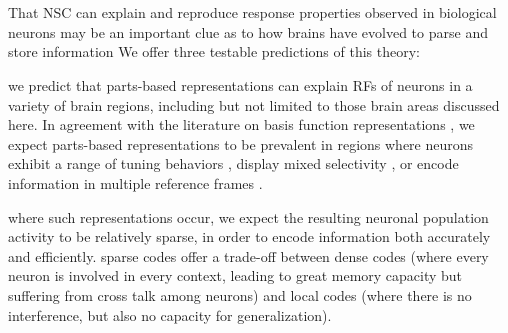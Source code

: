 \section*{}
\label{sec:discussion}

That \ac{NSC} can explain and reproduce response properties observed in biological neurons may be an important clue as to how brains have evolved to parse and store information
We offer three testable predictions of this theory:


 we predict that parts-based representations can explain
\acp{RF} of neurons in a variety of brain regions,
including but not limited to those brain areas discussed here. 
In agreement with the literature on basis function representations
\cite{PougetSejnowski1997,PougetSnyder2000,Poggio1990},
we expect parts-based representations
to be prevalent in regions where neurons
exhibit a range of tuning behaviors \cite{Beyeler2016},
display mixed selectivity \cite{Fusi2016,Eichenbaum2017},
or encode information in multiple reference frames \cite{AlexanderNitz2015,Rounds2016,Rounds2018}.

 where such representations occur, we expect the resulting
neuronal population activity to be relatively sparse,
in order to encode information both accurately and efficiently.
sparse codes offer a trade-off between 
dense codes (where every neuron is involved in every context,
leading to great memory capacity but suffering from cross talk among neurons)
and local codes (where there is no interference, 
but also no capacity for generalization). %





